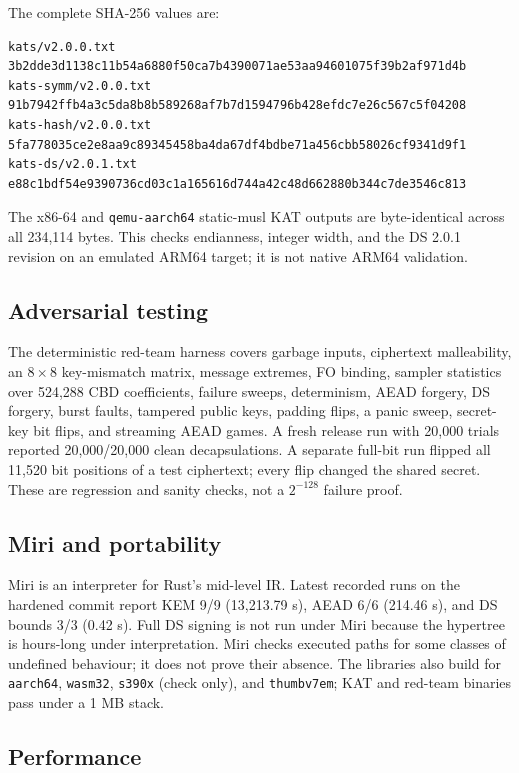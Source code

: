 \documentclass[11pt,a4paper]{article}
\theoremstyle{plain}
\theoremstyle{definition}
\theoremstyle{remark}
\begin{document}
The complete SHA-256 values are:

\begin{verbatim}
kats/v2.0.0.txt
3b2dde3d1138c11b54a6880f50ca7b4390071ae53aa94601075f39b2af971d4b
kats-symm/v2.0.0.txt
91b7942ffb4a3c5da8b8b589268af7b7d1594796b428efdc7e26c567c5f04208
kats-hash/v2.0.0.txt
5fa778035ce2e8aa9c89345458ba4da67df4bdbe71a456cbb58026cf9341d9f1
kats-ds/v2.0.1.txt
e88c1bdf54e9390736cd03c1a165616d744a42c48d662880b344c7de3546c813
\end{verbatim}

The x86-64 and \texttt{qemu-aarch64} static-musl KAT outputs are
byte-identical across all 234,114 bytes.  This checks endianness,
integer width, and the DS 2.0.1 revision on an emulated ARM64 target;
it is not native ARM64 validation.

\subsection{Adversarial testing}

The deterministic red-team harness covers garbage inputs, ciphertext
malleability, an $8\times8$ key-mismatch matrix, message extremes, FO
binding, sampler statistics over 524,288 CBD coefficients, failure
sweeps, determinism, AEAD forgery, DS forgery, burst faults, tampered
public keys, padding flips, a panic sweep, secret-key bit flips, and
streaming AEAD games.  A fresh release run with 20,000 trials reported
20,000/20,000 clean decapsulations.  A separate full-bit run flipped all
11,520 bit positions of a test ciphertext; every flip changed the
shared secret.  These are regression and sanity checks, not a
$2^{-128}$ failure proof.

\subsection{Miri and portability}

Miri is an interpreter for Rust's mid-level IR.  Latest recorded runs
on the hardened commit report KEM 9/9 (13,213.79 s), AEAD 6/6
(214.46 s), and DS bounds 3/3 (0.42 s).  Full DS signing is not run
under Miri because the hypertree is hours-long under interpretation.
Miri checks executed paths for some classes of undefined behaviour; it
does not prove their absence.  The libraries also build for
\texttt{aarch64}, \texttt{wasm32}, \texttt{s390x} (check only), and
\texttt{thumbv7em}; KAT and red-team binaries pass under a 1 MB stack.

\subsection{Performance}
\end{document}
